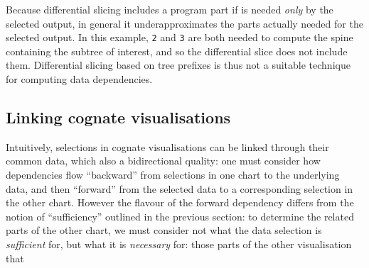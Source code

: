 \noindent Because differential slicing includes a program part if is needed \emph{only} by the selected output, in general it underapproximates the parts actually needed for the selected output. In this example, \lstinline{2} and \lstinline{3} are both needed to compute the spine containing the subtree of interest, and so the differential slice does not include them. Differential slicing based on tree prefixes is thus not a suitable technique for computing data dependencies.

\subsection{Linking cognate visualisations}

Intuitively, selections in cognate visualisations can be linked through their common data, which also a bidirectional quality: one must consider how dependencies flow ``backward'' from selections in one chart to the underlying data, and then ``forward'' from the selected data to a corresponding selection in the other chart. However the flavour of the forward dependency differs from the notion of ``sufficiency'' outlined in the previous section: to determine the related parts of the other chart, we must consider not what the data selection is \emph{sufficient} for, but what it is \emph{necessary} for: those parts of the other visualisation that



